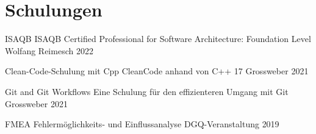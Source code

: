
\section{Schulungen}
\begin{cvhonors}

\cvhonor
{ISAQB} %
{ISAQB Certified Professional for
Software Architecture: Foundation Level} %
{Wolfang Reimesch} %
{2022} %


\cvhonor
{Clean-Code-Schulung mit Cpp} %
{CleanCode anhand von C++ 17} %
{Grossweber} %
{2021} %

\cvhonor
{Git and Git Workflows} %
{Eine Schulung für den effizienteren Umgang mit Git} %
{Grossweber} %
{2021} %

\cvhonor
{FMEA} %
{Fehlermöglichkeits- und Einflussanalyse} %
{DGQ-Veranstaltung} %
{2019} %

\end{cvhonors}